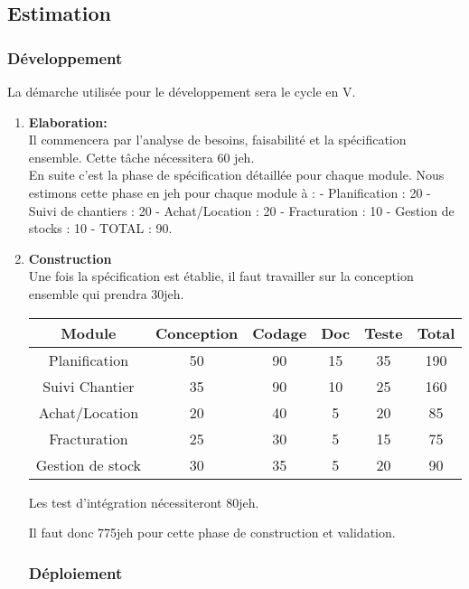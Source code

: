 \begin{description}
\subsection{Estimation}

\subsubsection{Développement}
La démarche utilisée pour le développement sera le cycle en V. 

\begin{enumerate}
\item \textbf{Elaboration:}\\ Il commencera par l'analyse de besoins, faisabilité et la spécification ensemble. Cette tâche nécessitera  60 jeh. \\

En suite c'est la phase de spécification détaillée pour chaque module. Nous estimons cette phase en jeh pour chaque module à :
     - Planification : 20
     - Suivi de chantiers : 20 
     - Achat/Location : 20 
     - Fracturation : 10
     - Gestion de stocks : 10 
     - TOTAL : 90.

\item \textbf{Construction}\\
Une fois la spécification est établie, il faut travailler sur la conception ensemble qui prendra 30jeh. 

\begin{center} 
    \begin{tabular}{ |c| c| c | c | c |c |}
    \hline
	 Module&Conception&Codage&Doc&Teste&Total\\ \hline
    Planification & 50 & 90 & 15 &35&190\\ \hline
    Suivi Chantier &35&90&10&25&160 \\ \hline
    Achat/Location &20&40&5&20&85  \\ \hline
    Fracturation &25&30&5&15&75\\ \hline
    Gestion de stock &30&35&5&20&90 \\
    \hline
    \end{tabular}
\end{center}

Les test d'intégration nécessiteront 80jeh.

Il faut donc 775jeh pour cette phase de construction et validation.

\subsubsection{Déploiement}


\end{enumerate}
\end{description}
